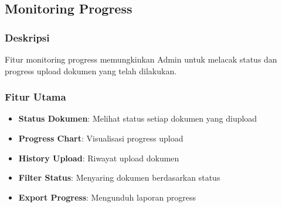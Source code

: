 \documentclass[12pt,a4paper]{article}
\begin{document}
\subsection{Monitoring Progress}

\subsubsection{Deskripsi}
Fitur monitoring progress memungkinkan Admin untuk melacak status dan progress upload dokumen yang telah dilakukan.

\subsubsection{Fitur Utama}
\begin{itemize}
\item \textbf{Status Dokumen}: Melihat status setiap dokumen yang diupload
\item \textbf{Progress Chart}: Visualisasi progress upload
\item \textbf{History Upload}: Riwayat upload dokumen
\item \textbf{Filter Status}: Menyaring dokumen berdasarkan status
\item \textbf{Export Progress}: Mengunduh laporan progress
\end{itemize}
\end{document}
